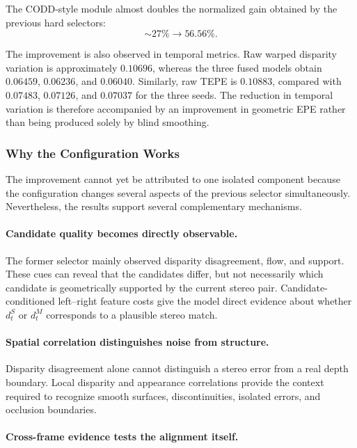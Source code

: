 \documentclass[11pt,a4paper]{article}
\begin{document}
The CODD-style module almost doubles the normalized gain obtained by the previous hard
selectors:
\begin{equation}
    \sim27\%
    \longrightarrow
    56.56\%.
\end{equation}

The improvement is also observed in temporal metrics. Raw warped disparity variation is
approximately \(0.10696\), whereas the three fused models obtain \(0.06459\),
\(0.06236\), and \(0.06040\). Similarly, raw TEPE is \(0.10883\), compared with
\(0.07483\), \(0.07126\), and \(0.07037\) for the three seeds. The reduction in temporal
variation is therefore accompanied by an improvement in geometric EPE rather than being
produced solely by blind smoothing.

\subsubsection{Why the Configuration Works}

The improvement cannot yet be attributed to one isolated component because the
configuration changes several aspects of the previous selector simultaneously. Nevertheless,
the results support several complementary mechanisms.

\paragraph{Candidate quality becomes directly observable.}

The former selector mainly observed disparity disagreement, flow, and support. These cues
can reveal that the candidates differ, but not necessarily which candidate is geometrically
supported by the current stereo pair. Candidate-conditioned left--right feature costs give
the model direct evidence about whether \(d_t^{S}\) or \(d_t^{M}\) corresponds to a plausible
stereo match.

\paragraph{Spatial correlation distinguishes noise from structure.}

Disparity disagreement alone cannot distinguish a stereo error from a real depth boundary.
Local disparity and appearance correlations provide the context required to recognize
smooth surfaces, discontinuities, isolated errors, and occlusion boundaries.

\paragraph{Cross-frame evidence tests the alignment itself.}
\end{document}
